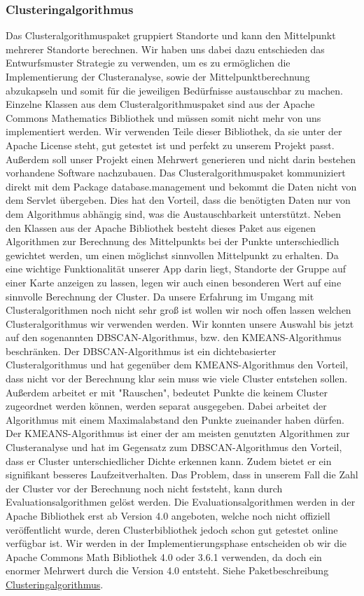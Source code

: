 \subsubsection{Clusteringalgorithmus}

Das Clusteralgorithmuspaket gruppiert Standorte und kann den Mittelpunkt mehrerer Standorte berechnen. Wir haben uns dabei dazu entschieden das Entwurfsmuster Strategie zu verwenden, um es zu ermöglichen die Implementierung der Clusteranalyse, sowie der Mittelpunktberechnung abzukapseln und somit für die jeweiligen Bedürfnisse austauschbar zu machen. Einzelne Klassen aus dem Clusteralgorithmuspaket sind aus der Apache Commons Mathematics Bibliothek und müssen somit nicht mehr von uns implementiert werden. Wir verwenden Teile dieser Bibliothek, da sie unter der Apache License steht, gut getestet ist und perfekt zu unserem Projekt passt. Außerdem soll unser Projekt einen Mehrwert generieren und nicht darin bestehen vorhandene Software nachzubauen. Das Clusteralgorithmuspaket kommuniziert direkt mit dem Package database.management und bekommt die Daten nicht von dem Servlet übergeben. Dies hat den Vorteil, dass die benötigten Daten nur von dem Algorithmus abhängig sind, was die Austauschbarkeit unterstützt. Neben den Klassen aus der Apache Bibliothek besteht dieses Paket aus eigenen Algorithmen zur Berechnung des Mittelpunkts bei der Punkte unterschiedlich gewichtet werden, um einen möglichst sinnvollen Mittelpunkt zu erhalten. Da eine wichtige Funktionalität unserer App darin liegt, Standorte der Gruppe auf einer Karte anzeigen zu lassen, legen wir auch einen besonderen Wert auf eine sinnvolle Berechnung der Cluster. Da unsere Erfahrung im Umgang mit Clusteralgorithmen noch nicht sehr groß ist wollen wir noch offen lassen welchen Clusteralgorithmus wir verwenden werden. Wir konnten unsere Auswahl bis jetzt auf den sogenannten DBSCAN-Algorithmus, bzw. den KMEANS-Algorithmus beschränken. Der DBSCAN-Algorithmus ist ein dichtebasierter Clusteralgorithmus und hat gegenüber dem KMEANS-Algorithmus den Vorteil, dass nicht vor der Berechnung klar sein muss wie viele Cluster entstehen sollen. Außerdem arbeitet er mit "Rauschen", bedeutet Punkte die keinem Cluster zugeordnet werden können, werden separat ausgegeben. Dabei arbeitet der Algorithmus mit einem Maximalabstand den Punkte zueinander haben dürfen. 
Der KMEANS-Algorithmus ist einer der am meisten genutzten Algorithmen zur Clusteranalyse und hat im Gegensatz zum DBSCAN-Algorithmus den Vorteil, dass er Cluster unterschiedlicher Dichte erkennen kann. Zudem bietet er ein signifikant besseres Laufzeitverhalten. Das Problem, dass in unserem Fall die Zahl der Cluster vor der Berechnung noch nicht feststeht, kann durch Evaluationsalgorithmen gelöst werden. Die Evaluationsalgorithmen werden in der Apache Bibliothek erst ab Version 4.0 angeboten, welche noch nicht offiziell veröffentlicht wurde, deren Clusterbibliothek jedoch schon gut getestet online verfügbar ist.
Wir werden in der Implementierungsphase entscheiden ob wir die Apache Commons Math Bibliothek 4.0 oder 3.6.1 verwenden, da doch ein enormer Mehrwert durch die Version 4.0 entsteht.
\newline
Siehe Paketbeschreibung \hyperlink{algorithm}{Clusteringalgorithmus}.
  \newline
 
